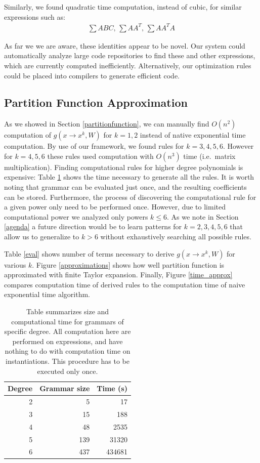 Similarly, we found quadratic time computation, instead of cubic, for
similar expressions such as: 
\begin{align*}
	\sum ABC\text{, }\sum AA^T\text{, }\sum AA^TA
\end{align*}

As far we we are aware, these identities appear to be novel. Our
system could automatically analyze large code repositories to find
these and other expressions, which are currently computed
inefficiently. Alternatively, our optimization rules could be placed
into compilers to generate efficient code.

\subsection{Partition Function Approximation}

As we showed in Section \ref{partitionfunction}, we can manually find
$O(n^2)$ computation of $g(x \rightarrow x^k, W)$ for $k = 1, 2$
instead of native exponential time computation. By use of our
framework, we found rules for $k = 3, 4, 5, 6$. However for $k = 4, 5, 6$
these rules used computation with $O(n^3)$ time (i.e.~matrix
multiplication). Finding computational rules for higher degree
polynomials is expensive: Table \ref{grammars} shows the time
necessary to generate all the rules. It is worth noting that grammar
can be evaluated just once, and the resulting coefficients can be
stored. Furthermore, the process of discovering the computational rule
for a given power only need to be performed once. However, due to limited computational
power we analyzed only powers $k \leq 6$. As we note in Section
\ref{agenda} a future direction would be to learn patterns for
$k=2, 3, 4, 5, 6$ that allow us to generalize to $k>6$ without exhaustively
searching all possible rules. 

Table \ref{eval} shows number of terms necessary to derive $g(x
\rightarrow x^k, W)$ for various $k$. Figure \ref{approximations} shows
how well partition function is approximated with finite Taylor
expansion. Finally, Figure \ref{time_approx} compares computation time
of derived rules to the computation time of naive exponential time
algorithm.

\begin{table}
\tiny
\centering
\begin{tabular}{rrr}
\hline
Degree & Grammar size & Time (s) \\
\hline
2 & 5 & 17 \\
3 & 15 & 188 \\
4 & 48 & 2535\\
5 & 139 & 31320 \\
6 & 437 & 434681 \\
\hline
\end{tabular}
\caption{Table summarizes size and computational time for grammars of specific degree. 
All computation here are performed on expressions, and have nothing to do with computation time on instantiations.
This procedure has to be executed only once.}
\label{grammars}
\end{table}

